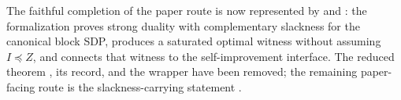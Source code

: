 \documentclass[11pt]{article}
\begin{document}
The faithful completion of the paper route is now represented by
 and
: the
formalization proves strong duality with complementary slackness for the
canonical block SDP, produces a saturated optimal witness without assuming
$I\preceq Z$, and connects that witness to the self-improvement interface.
The reduced theorem , its  record, and the
wrapper  have been removed; the
remaining paper-facing route is the slackness-carrying statement
.



\end{document}
